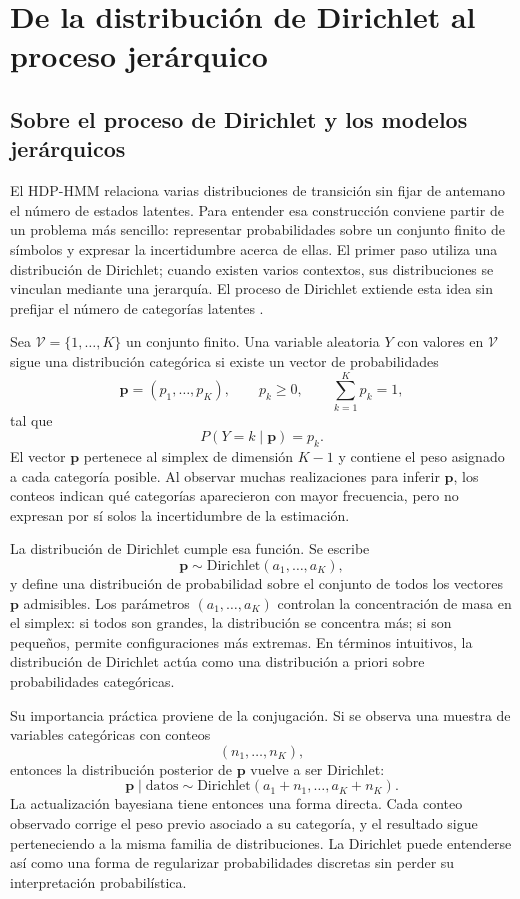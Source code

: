 \chapter{De la distribución de Dirichlet al proceso jerárquico}
\label{app:dirichlet}

\section{Sobre el proceso de Dirichlet y los modelos jerárquicos}

El HDP-HMM relaciona varias distribuciones de transición sin fijar de antemano el número de estados latentes. Para entender esa construcción conviene partir de un problema más sencillo: representar probabilidades sobre un conjunto finito de símbolos y expresar la incertidumbre acerca de ellas. El primer paso utiliza una distribución de Dirichlet; cuando existen varios contextos, sus distribuciones se vinculan mediante una jerarquía. El proceso de Dirichlet extiende esta idea sin prefijar el número de categorías latentes \cite{murphy2012,ferguson1973,teh2006}.

Sea $\mathcal V=\{1,\dots,K\}$ un conjunto finito. Una variable aleatoria $Y$ con valores en $\mathcal V$ sigue una distribución categórica si existe un vector de probabilidades
\[
\mathbf{p}=(p_1,\dots,p_K),\qquad p_k\ge 0,\qquad \sum_{k=1}^K p_k=1,
\]
tal que
\[
P(Y=k\mid \mathbf{p})=p_k.
\]
El vector $\mathbf{p}$ pertenece al simplex de dimensión $K-1$ y contiene el peso asignado a cada categoría posible. Al observar muchas realizaciones para inferir $\mathbf{p}$, los conteos indican qué categorías aparecieron con mayor frecuencia, pero no expresan por sí solos la incertidumbre de la estimación.

La distribución de Dirichlet cumple esa función. Se escribe
\[
\mathbf{p}\sim \mathrm{Dirichlet}(a_1,\dots,a_K),
\]
y define una distribución de probabilidad sobre el conjunto de todos los vectores $\mathbf{p}$ admisibles. Los parámetros $(a_1,\dots,a_K)$ controlan la concentración de masa en el simplex: si todos son grandes, la distribución se concentra más; si son pequeños, permite configuraciones más extremas. En términos intuitivos, la distribución de Dirichlet actúa como una distribución a priori sobre probabilidades categóricas.

Su importancia práctica proviene de la conjugación. Si se observa una muestra de variables categóricas con conteos
\[
(n_1,\dots,n_K),
\]
entonces la distribución posterior de $\mathbf{p}$ vuelve a ser Dirichlet:
\[
\mathbf{p}\mid \text{datos}\sim
\mathrm{Dirichlet}(a_1+n_1,\dots,a_K+n_K).
\]
La actualización bayesiana tiene entonces una forma directa. Cada conteo observado corrige el peso previo asociado a su categoría, y el resultado sigue perteneciendo a la misma familia de distribuciones. La Dirichlet puede entenderse así como una forma de regularizar probabilidades discretas sin perder su interpretación probabilística.

